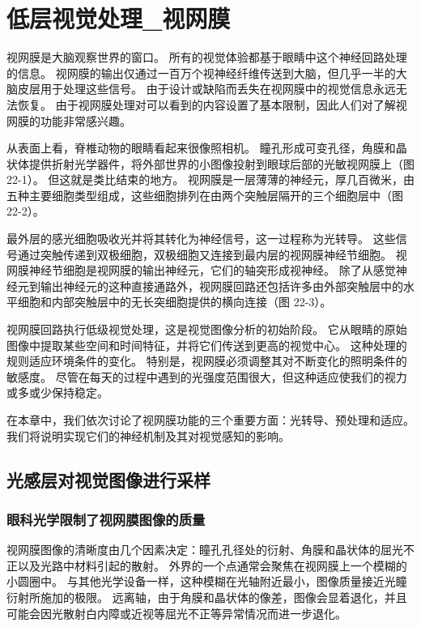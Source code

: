 \chapter{低层视觉处理\_视网膜} \label{chap:chap22}

视网膜是大脑观察世界的窗口。 所有的视觉体验都基于眼睛中这个神经回路处理的信息。 视网膜的输出仅通过一百万个视神经纤维传送到大脑，但几乎一半的大脑皮层用于处理这些信号。 由于设计或缺陷而丢失在视网膜中的视觉信息永远无法恢复。 由于视网膜处理对可以看到的内容设置了基本限制，因此人们对了解视网膜的功能非常感兴趣。

从表面上看，脊椎动物的眼睛看起来很像照相机。 瞳孔形成可变孔径，角膜和晶状体提供折射光学器件，将外部世界的小图像投射到眼球后部的光敏视网膜上（图 22-1）。 但这就是类比结束的地方。 视网膜是一层薄薄的神经元，厚几百微米，由五种主要细胞类型组成，这些细胞排列在由两个突触层隔开的三个细胞层中（图 22-2）。

最外层的感光细胞吸收光并将其转化为神经信号，这一过程称为光转导。 这些信号通过突触传递到双极细胞，双极细胞又连接到最内层的视网膜神经节细胞。 视网膜神经节细胞是视网膜的输出神经元，它们的轴突形成视神经。 除了从感觉神经元到输出神经元的这种直接通路外，视网膜回路还包括许多由外部突触层中的水平细胞和内部突触层中的无长突细胞提供的横向连接（图 22-3）。

视网膜回路执行低级视觉处理，这是视觉图像分析的初始阶段。 它从眼睛的原始图像中提取某些空间和时间特征，并将它们传送到更高的视觉中心。 这种处理的规则适应环境条件的变化。 特别是，视网膜必须调整其对不断变化的照明条件的敏感度。 尽管在每天的过程中遇到的光强度范围很大，但这种适应使我们的视力或多或少保持稳定。

在本章中，我们依次讨论了视网膜功能的三个重要方面：光转导、预处理和适应。 我们将说明实现它们的神经机制及其对视觉感知的影响。



\section{光感层对视觉图像进行采样}


\subsection{眼科光学限制了视网膜图像的质量}
视网膜图像的清晰度由几个因素决定：瞳孔孔径处的衍射、角膜和晶状体的屈光不正以及光路中材料引起的散射。 外界的一个点通常会聚焦在视网膜上一个模糊的小圆圈中。 与其他光学设备一样，这种模糊在光轴附近最小，图像质量接近光瞳衍射所施加的极限。 远离轴，由于角膜和晶状体的像差，图像会显着退化，并且可能会因光散射白内障或近视等屈光不正等异常情况而进一步退化。

